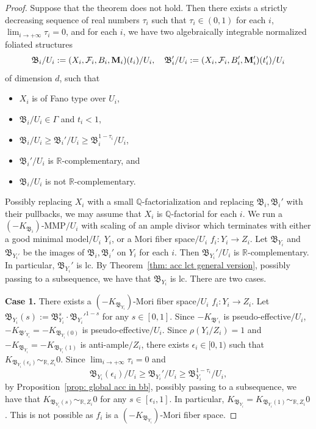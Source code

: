\documentclass[11pt,reqno]{amsart}
\numberwithin{equation}{section}
\newcommand{\Mm}{{\bf{M}}}
\newcommand{\Bb}{{\mathfrak{B}}}
\newcommand{\Ff}{\mathcal{F}}
\newcommand{\Ii}{\Gamma}
\theoremstyle{definition}
\begin{document}
\begin{proof}
    Suppose that the theorem does not hold. Then there exists a strictly decreasing sequence of real numbers $\tau_i$ such that $\tau_i\in (0,1)$ for each $i$, $\lim_{i\rightarrow+\infty}\tau_i=0$, and for each $i$, we have two algebraically integrable normalized foliated structures 
       $$\Bb_i/U_i:=(X_i,\Ff_i,B_i,\Mm_i)(t_i)/U_i,\quad \Bb_i'/U_i:=(X_i,\Ff_i,B_i',\Mm_i')(t_i')/U_i$$
      of dimension $d$, such that
       \begin{itemize}
       \item $X_i$ is of Fano type over $U_i$,
           \item $\Bb_i/U_i\in\Ii$ and $t_i<1$,
           \item        $\Bb_i/U_i\geq\Bb_i'/U_i\geq\Bb_i^{1-\tau_i}/U_i$, 
           \item $\Bb_i'/U_i$ is $\mathbb R$-complementary, and
           \item $\Bb_i/U_i$ is not $\mathbb R$-complementary.
       \end{itemize}
       Possibly replacing $X_i$ with a small $\mathbb Q$-factorialization and replacing $\Bb_i,\Bb_i'$ with their pullbacks, we may assume that $X_i$ is $\mathbb Q$-factorial for each $i$. We run a $\left(-K_{\Bb_i}\right)$-MMP$/U_i$ with scaling of an ample divisor which terminates with either a good minimal model$/U_i$ $Y_i$, or a Mori fiber space$/U_i$ $f_i: Y_i\rightarrow Z_i$. Let $\Bb_{Y_i}$ and $\Bb_{Y_i'}$ be the images of $\Bb_i,\Bb_i'$ on $Y_i$ for each $i$. Then $\Bb_{Y_i}'/U_i$ is $\mathbb R$-complementary. In particular, $\Bb_{Y_i}'$ is lc. By Theorem~\ref{thm: acc lct general version}, possibly passing to a subsequence, we have that $\Bb_{Y_i}$ is lc. There are two cases.

       \medskip

       \noindent\textbf{Case 1.} There exists a $(-K_{\Bb_{Y_i}})$-Mori fiber space$/U_i$ $f_i: Y_i\rightarrow Z_i$. Let $\Bb_{Y_i}(s):=\Bb_{Y_i}^{s}\cdot\Bb_{Y_i}'^{1-s}$ for any $s\in [0,1]$. Since $-K_{\Bb'_{i}}$ is pseudo-effective$/U_i$, $-K_{\Bb'_{Y_i}}=-K_{\Bb_{Y_i}(0)}$ is pseudo-effective$/U_i$. Since $\rho(Y_i/Z_i)=1$ and $-K_{\Bb_{Y_i}}=-K_{\Bb_{Y_i}(1)}$ is anti-ample$/Z_i$, there exists $\epsilon_i\in [0,1)$ such that $K_{\Bb_{Y_i}(\epsilon_i)}\sim_{\mathbb R,Z_i}0$. Since $\lim_{i\rightarrow+\infty}\tau_i=0$ and
       $$\Bb_{Y_i}(\epsilon_i)/U_i\geq\Bb_{Y_i}'/U_i\geq\Bb_{Y_i}^{1-\tau_i}/U_i,$$
       by Proposition~\ref{prop: global acc in bb}, possibly passing to a subsequence, we have that $K_{\Bb_{Y_i}(s)}\sim_{\mathbb R,Z_i}0$ for any $s\in [\epsilon_i,1]$. In particular, $K_{\Bb_{Y_i}}=K_{\Bb_{Y_i}(1)}\sim_{\mathbb R,Z_i}0$. This is not possible as $f_i$ is a $(-K_{\Bb_{Y_i}})$-Mori fiber space.


\end{proof}
\end{document}
